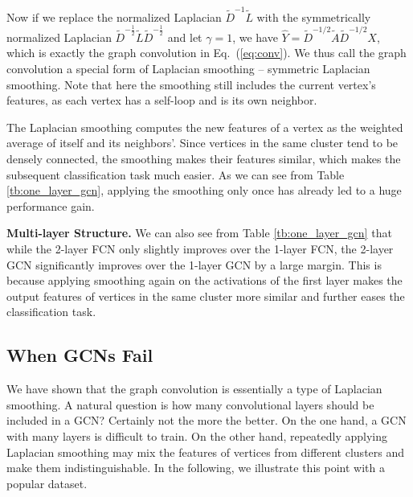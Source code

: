\documentclass[letterpaper]{article} \usepackage{aaai18}  \usepackage{times}  \usepackage{helvet}  \usepackage{courier}  \usepackage{url}  \usepackage{graphicx}  \usepackage{algorithm}
\begin{document}
Now if we replace the normalized Laplacian $\tilde{D}^{-1}\tilde{L}$ with the symmetrically normalized Laplacian $\tilde{D}^{-\frac{1}{2}}\tilde{L}\tilde{D}^{-\frac{1}{2}}$ and let $\gamma=1$, we have $\hat{Y}=\tilde{D}^{-1/2}\tilde{A}\tilde{D}^{-1/2}X$, which is exactly the graph convolution in Eq.~(\ref{eq:conv}). We thus call the graph convolution a special form of Laplacian smoothing -- symmetric Laplacian smoothing. Note that here the smoothing still includes the current vertex's features, as each vertex has a self-loop and is its own neighbor.







The Laplacian smoothing computes the new features of a vertex as the weighted average of itself and its neighbors'. Since vertices in the same cluster tend to be densely connected, the smoothing makes their features similar, which makes the subsequent classification task much easier. As we can see from Table \ref{tb:one_layer_gcn}, applying the smoothing only once has already led to a huge performance gain.



\textbf{Multi-layer Structure.} We can also see from Table \ref{tb:one_layer_gcn} that while the 2-layer FCN only slightly improves over the 1-layer FCN, the 2-layer GCN significantly improves over the 1-layer GCN by a large margin. This is because applying smoothing again on the activations of the first layer makes the output features of vertices in the same cluster more similar and further eases the classification task.








\subsection{When GCNs Fail}










We have shown that the graph convolution is essentially a type of Laplacian smoothing. A natural question is how many convolutional layers should be included in a GCN? Certainly not the more the better. On the one hand, a GCN with many layers is difficult to train. On the other hand, repeatedly applying Laplacian smoothing may mix the features of vertices from different clusters and make them indistinguishable. In the following, we illustrate this point with a popular dataset.
\end{document}
